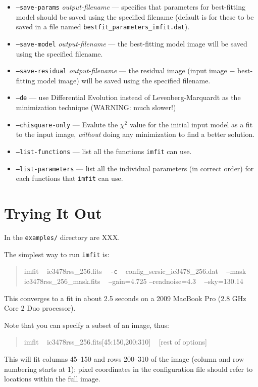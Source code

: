 \documentclass[10pt]{article}
\newcommand{\imfit}{\texttt{imfit}}
\begin{document}
\begin{itemize}
\bigskip

\item \texttt{--save-params} \textit{output-filename} --- specifies that parameters 
for best-fitting model should be saved using the specified filename (default is
for these to be saved in a file named \texttt{bestfit\_parameters\_imfit.dat}).
\item \texttt{--save-model} \textit{output-filename} --- the best-fitting model image
will be saved using the specified filename.
\item \texttt{--save-residual} \textit{output-filename} --- the residual image (input
image $-$ best-fitting model image) will be saved using the specified filename.

\bigskip
\item \texttt{--de} --- use Differential Evolution instead of Levenberg-Marquardt as
the minimization technique (WARNING: much slower!)
\item \texttt{--chisquare-only} --- Evalute the $\chi^2$ value for the initial input
model as a fit to the input image, \textit{without} doing any minimization to find
a better solution.

\bigskip

\item \texttt{--list-functions} --- list all the functions \imfit{} can use.

\item \texttt{--list-parameters} --- list all the individual parameters (in correct order)
for each functions that \imfit{} can use.
\end{itemize}




\section{Trying It Out}

In the \texttt{examples/} directory are XXX.

The simplest way to run \imfit{} is:
\begin{quote}
imfit ~ ic3478rss\_256.fits ~ \texttt{-c} ~ config\_sersic\_ic3478\_256.dat ~ \texttt{--}mask ~ ic3478rss\_256\_mask.fits ~ \texttt{--}gain=4.725 \texttt{--}readnoise=4.3 ~ \texttt{--}sky=130.14
\end{quote}

This converges to a fit in about 2.5 seconds on a 2009 MacBook Pro (2.8 GHz Core 2 Duo processor).

Note that you can specify a subset of an image, thus:
\begin{quote}
imfit ~ ic3478rss\_256.fits[45:150,200:310] ~ [rest of options]
\end{quote}
This will fit columns 45--150 and rows 200--310 of the image (column and row numbering starts
at 1); pixel coordinates in the configuration file should refer to locations within the
full image.
\end{document}
